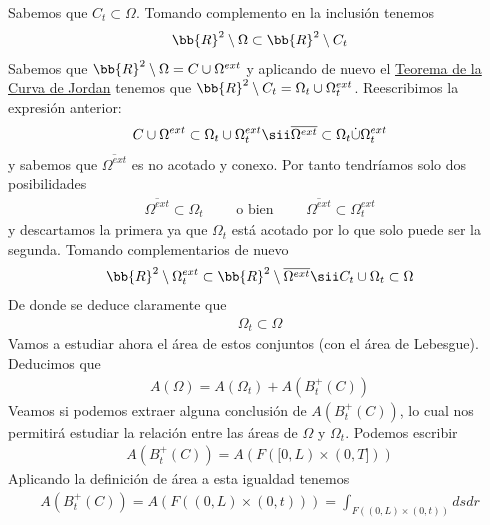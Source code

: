 \begin{ejercicio}
\begin{solucion}
        Sabemos que $C_t\subset \Omega$. Tomando complemento en la inclusión tenemos
        \begin{gather*}
            \bb{R}^2 \setminus \Omega \subset \bb{R}^2 \setminus C_t
        \end{gather*}
        Sabemos que $\bb{R}^2 \setminus \Omega = C\cup \Omega^{ext}$ y aplicando de nuevo el \hyperref[teo:clasif]{Teorema de la Curva de Jordan} tenemos que $\bb{R}^2 \setminus C_t = \Omega_t \cup \Omega_t^{ext}$. Reescribimos la expresión anterior:
        \begin{gather*}
            C\cup \Omega^{ext} \subset \Omega_t \cup \Omega_t^{ext} \sii \overline{\Omega^{ext}} \subset \Omega_t \dot{\cup} \Omega_t^{ext}
        \end{gather*}
        y sabemos que $\overline{\Omega^{ext}}$ es no acotado y conexo. Por tanto tendríamos solo dos posibilidades
        \begin{gather*}
            \overline{\Omega^{ext}} \subset \Omega_t \qquad \text{ o bien } \qquad \overline{\Omega^{ext}} \subset \Omega_t^{ext}
        \end{gather*}
        y descartamos la primera ya que $\Omega_t$ está acotado por lo que solo puede ser la segunda. Tomando complementarios de nuevo
        \begin{gather*}
            \bb{R}^2 \setminus \Omega_t^{ext} \subset \bb{R}^2 \setminus \overline{\Omega^{ext}} \sii C_t\cup \Omega_t \subset \Omega
        \end{gather*}
        De donde se deduce claramente que
        \begin{gather*}
            \Omega_t \subset \Omega
        \end{gather*} 
        Vamos a estudiar ahora el área de estos conjuntos (con el área de Lebesgue). Deducimos que 
        \begin{gather*}
            A(\Omega) = A(\Omega_t) + A(B_t^+(C))
        \end{gather*}
        Veamos si podemos extraer alguna conclusión de $A(B_t^+(C))$, lo cual nos permitirá estudiar la relación entre las áreas de $\Omega$ y $\Omega_t$. Podemos escribir
        \begin{gather*}
            A(B_t^+(C)) = A(F([0,L)\times (0,T]))
        \end{gather*}
        Aplicando la definición de área a esta igualdad tenemos
        \begin{gather*}
            A(B_t^+(C)) = A(F((0,L)\times (0,t))) = \int_{F((0,L)\times (0,t))} dsdr

\end{gather*}
\end{solucion}
\end{ejercicio}
